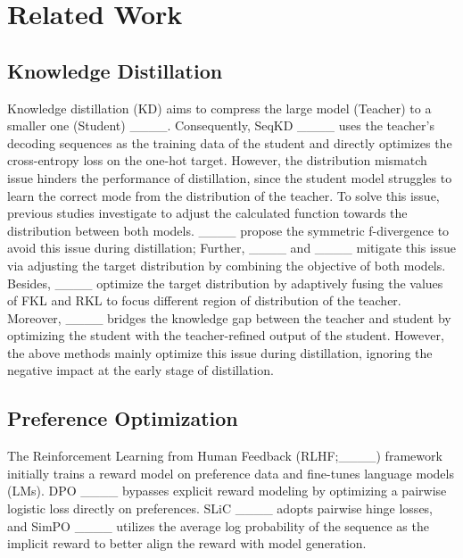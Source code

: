 \section{Related Work}
\subsection{Knowledge Distillation}
Knowledge distillation (KD) aims to compress the large model (Teacher) to a smaller one (Student) ____. 
% 
Consequently, SeqKD ____ uses the teacher’s decoding sequences as the training data of the student and directly optimizes the cross-entropy loss on the one-hot target.
% 
However, the distribution mismatch issue hinders the performance of distillation, since the student model struggles to learn the correct mode from the distribution of the teacher.
% 
To solve this issue, previous studies investigate to adjust the calculated function towards the distribution between both models.
% 
____ propose the symmetric f-divergence to avoid this issue during distillation;
% 
Further, ____ and ____ mitigate this issue via adjusting the target distribution by combining the objective of both models.
% 
Besides, ____ optimize the target distribution by adaptively fusing the values of FKL and RKL to focus different region of distribution of the teacher.
% 
Moreover, ____ bridges the knowledge gap between the teacher and student by optimizing the student with the teacher-refined output of the student.
% 
However, the above methods mainly optimize this issue during distillation, ignoring the negative impact at the early stage of distillation.


\subsection{Preference Optimization}
The Reinforcement Learning from Human Feedback (RLHF;____) framework initially trains a reward model on preference data and fine-tunes language models (LMs).
% 
DPO ____ bypasses explicit reward modeling by optimizing a pairwise logistic loss directly on preferences. 
% 
SLiC ____ adopts pairwise hinge losses, and SimPO ____ utilizes the average log probability of the sequence as the implicit reward to better align the reward with model generation.
% 
%